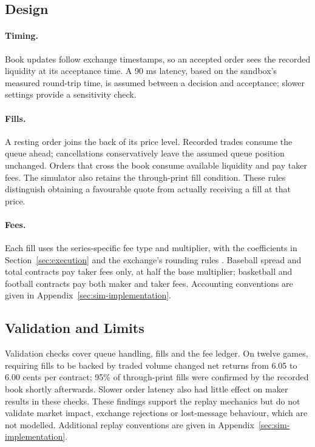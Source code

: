 \documentclass[12pt,a4paper,oneside]{report}
\begin{document}
\subsection{Design}
\paragraph{Timing.} Book updates follow exchange timestamps, so an accepted
order sees the recorded liquidity at its acceptance time. A 90 ms latency,
based on the sandbox's measured round-trip time, is assumed between a decision
and acceptance; slower settings provide a sensitivity check.

\paragraph{Fills.} A resting order joins the back of its price level. Recorded
trades consume the queue ahead; cancellations conservatively leave the assumed
queue position unchanged. Orders that cross the book consume available
liquidity and pay taker fees. The simulator also retains the through-print
fill condition. These rules distinguish obtaining a favourable quote from
actually receiving a fill at that price.

\paragraph{Fees.} Each fill uses the series-specific fee type and multiplier,
with the coefficients in Section~\ref{sec:execution} and the exchange's rounding
rules \citep{kalshi2026feeschedule}. Baseball spread and total contracts
pay taker fees only, at half the base multiplier; basketball and football
contracts pay both maker and taker fees. Accounting conventions are given in
Appendix~\ref{sec:sim-implementation}.

\subsection{Validation and Limits}
Validation checks cover queue handling, fills and the fee ledger. On twelve
games, requiring fills to be backed by traded volume changed net returns from
6.05 to 6.00 cents per contract; 95\% of through-print fills were confirmed by
the recorded book shortly afterwards. Slower order latency also had little
effect on maker results in these checks. These findings support the replay
mechanics but do not validate market impact, exchange rejections or lost-message
behaviour, which are not modelled. Additional replay conventions are given in
Appendix~\ref{sec:sim-implementation}.
\end{document}
